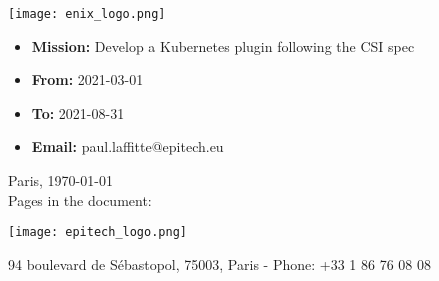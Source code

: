 \pagestyle{fancy}
\thispagestyle{empty}

\begin{spacing}{1.5}
    \center
    \texttt{[image: enix\_logo.png]}\\
    \vspace{0.5 cm}
    {\fontsize{16}{18}\selectfont {}}
\end{spacing}

\vspace{1 cm}
\noindent\begin{minipage}[t]{6cm}
    \begin{itemize}[label=, leftmargin=*, itemsep=0pt]
        \item \textbf{Mission:} Develop a Kubernetes plugin following the CSI spec
        \item \textbf{From:   } 2021-03-01
        \item \textbf{To:     } 2021-08-31
        \item \textbf{Email:  } paul.laffitte@epitech.eu
    \end{itemize}
\end{minipage}
\hfill
\begin{minipage}[t]{5.4cm}
    \begin{flushleft}
        \begin{spacing}{1.8}
            Paris, \today\\
            Pages in the document: \pageref{LastPage}
        \end{spacing}
    \end{flushleft}
\end{minipage}

\vspace{1cm}

\begin{flushright}
    {\Huge \title\\}
    \hrulefill \\ \vspace{0.5 cm}
    {\LARGE \subtitle}
\end{flushright}
\vspace{1.5 cm}

\begin{center}
    \texttt{[image: epitech\_logo.png]}
    \vspace{0.5 cm}

    \vspace{4.5cm}

    {\scriptsize 94 boulevard de Sébastopol, 75003, Paris - Phone: +33 1 86 76 08 08}
\end{center}

\newpage
